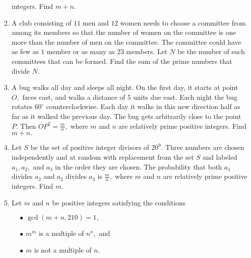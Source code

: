\documentclass{article}
\begin{document}
\begin{enumerate}[label=\arabic*., itemsep=0.5em]
integers. Find $m+n$.\par \vspace{0.5em}\item A club consisting of $11$ men and $12$ women needs to choose a committee from among its members so that the number of women on the committee is one more than the number of men on the committee. The committee could have as few as $1$ member or as many as $23$ members. Let $N$ be the number of such committees that can be formed. Find the sum of the prime numbers that divide $N.$\par \vspace{0.5em}\item A bug walks all day and sleeps all night. On the first day, it starts at point $O,$ faces east, and walks a distance of $5$ units due east. Each night the bug rotates $60^\circ$ counterclockwise. Each day it walks in this new direction half as far as it walked the previous day. The bug gets arbitrarily close to the point $P.$ Then $OP^2=\tfrac{m}{n},$ where $m$ and $n$ are relatively prime positive integers. Find $m+n.$\par \vspace{0.5em}\item Let $S$ be the set of positive integer divisors of $20^9.$ Three numbers are chosen independently and at random with replacement from the set $S$ and labeled $a_1,a_2,$ and $a_3$ in the order they are chosen. The probability that both $a_1$ divides $a_2$ and $a_2$ divides $a_3$ is $\tfrac{m}{n},$ where $m$ and $n$ are relatively prime positive integers. Find $m.$\par \vspace{0.5em}\item Let $m$ and $n$ be positive integers satisfying the conditions

$\quad\bullet\ \gcd(m+n,210)=1,$

$\quad\bullet\ m^m$ is a multiple of $n^n,$ and

$\quad\bullet\ m$ is not a multiple of $n.$


\end{enumerate}
\end{document}
